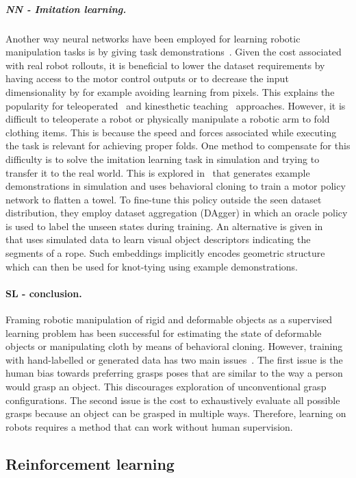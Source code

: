 \documentclass[\home/main.tex]{subfiles}
\begin{document}
\subparagraph{NN - Imitation learning.}
Another way neural networks have been employed for learning robotic manipulation tasks is by giving task demonstrations~\autocite{Ravichandar2020}. Given the cost associated with real robot rollouts, it is beneficial to lower the dataset requirements by having access to the motor control outputs or to decrease the input dimensionality by for example avoiding learning from pixels. This explains the popularity for teleoperated~\autocite{Zhang2018,Duan2017} and kinesthetic teaching~\autocite{finn2017one} approaches. However, it is difficult to teleoperate a robot or physically manipulate a robotic arm to fold clothing items. This is because the speed and forces associated while executing the task is relevant for achieving proper folds. One method to compensate for this difficulty is to solve the imitation learning task in simulation and trying to transfer it to the real world. This is explored in~\autocite{Seita2020} that generates example demonstrations in simulation and uses behavioral cloning to train a motor policy network to flatten a towel. To fine-tune this policy outside the seen dataset distribution, they employ dataset aggregation (DAgger) in which an oracle policy is used to label the unseen states during training. An alternative is given in ~\autocite{Sundaresan2020} that uses simulated data to learn visual object descriptors indicating the segments of a rope. Such embeddings implicitly encodes geometric structure which can then be used for knot-tying using example demonstrations.

\paragraph{SL - conclusion.}
Framing robotic manipulation of rigid and deformable objects as a supervised learning problem has been successful for estimating the state of deformable objects or manipulating cloth by means of behavioral cloning. However, training with hand-labelled or generated data has two main issues~\autocite{pinto2016supersizing}. The first issue is the human bias towards preferring grasps poses that are similar to the way a person would grasp an object. This discourages exploration of unconventional grasp configurations. The second issue is the cost to exhaustively evaluate all possible grasps because an object can be grasped in multiple ways. Therefore, learning on robots requires a method that can work without human supervision.

\subsection{Reinforcement learning} \label{subsec:lit_rl}
\end{document}
